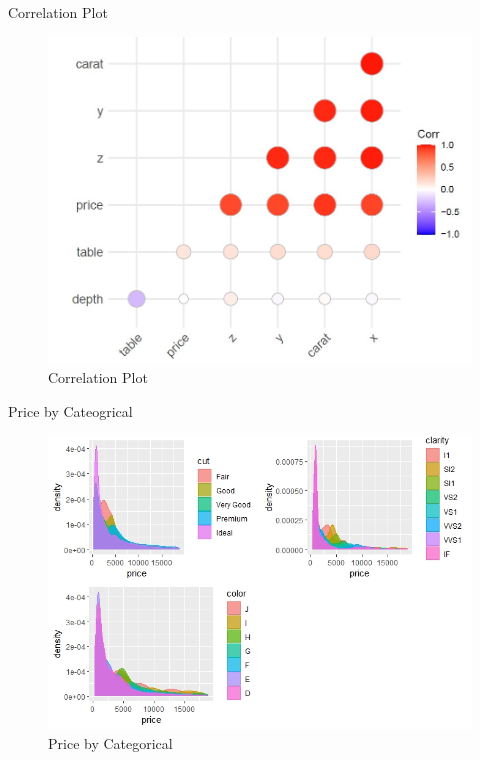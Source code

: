 \documentclass[
  ignorenonframetext,
]{beamer}
\begin{document}
\begin{frame}{Correlation Plot}
\protect\hypertarget{correlation-plot}{}
\begin{figure}
\centering
\includegraphics[width=\textwidth,height=0.85\textheight]{./Corrplot_diamonds.jpg}
\caption{Correlation Plot}
\end{figure}
\end{frame}

\begin{frame}{Price by Cateogrical}
\protect\hypertarget{price-by-cateogrical}{}
\begin{figure}
\centering
\includegraphics{./pricebycategorical.jpeg}
\caption{Price by Categorical}
\end{figure}
\end{frame}
\end{document}
